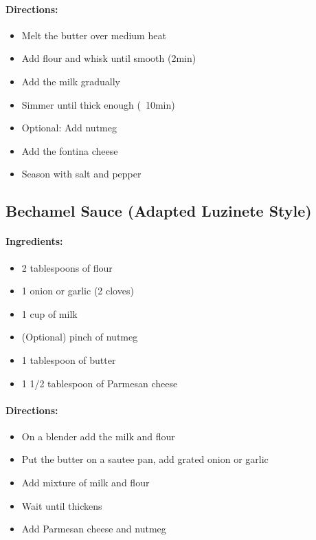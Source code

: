 \documentclass{article}
\begin{document}
\paragraph{Directions:}
\begin{itemize}
\item Melt the butter over medium heat
\item Add flour and whisk until smooth (2min)
\item Add the milk gradually
\item Simmer until thick enough (~10min)
\item Optional: Add nutmeg
\item Add the fontina cheese
\item Season with salt and pepper
\end{itemize}

\subsection{Bechamel Sauce (Adapted Luzinete Style)}

\paragraph{Ingredients:}

\begin{itemize}
	\item 2 tablespoons of flour
	\item 1 onion or garlic (2 cloves)
	\item 1 cup of milk
	\item (Optional) pinch of nutmeg
	\item 1 tablespoon of butter
	\item 1 1/2 tablespoon of Parmesan cheese
\end{itemize}

\paragraph{Directions:}
\begin{itemize}
	\item On a blender add the milk and flour
	\item Put the butter on a sautee pan, add grated onion or garlic
	\item Add mixture of milk and flour
	\item Wait until thickens
	\item Add Parmesan cheese and nutmeg
\end{itemize}
\end{document}
